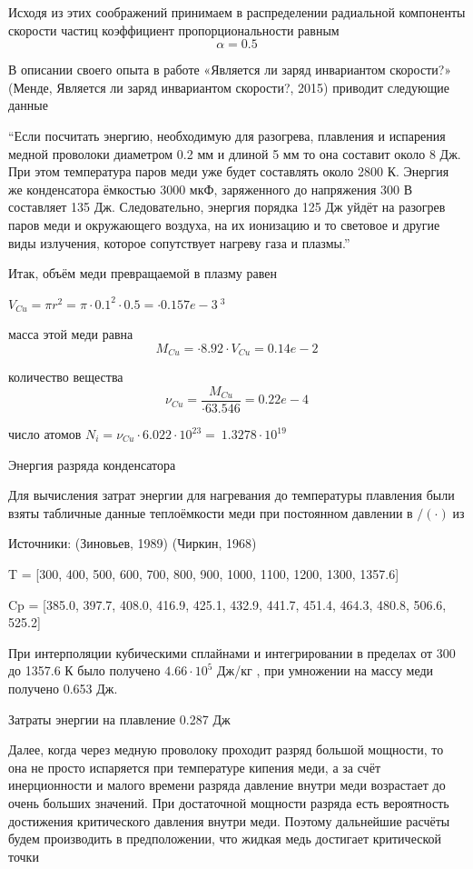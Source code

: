 ﻿\documentclass[12pt, letterpaper]{article}
\begin{document}
Исходя из этих соображений принимаем в распределении радиальной компоненты скорости частиц коэффициент пропорциональности равным $$\alpha = 0.5$$


В описании своего опыта в работе «Является ли заряд инвариантом скорости?» (Менде, Является ли заряд инвариантом скорости?, 2015) приводит следующие данные

“Если посчитать энергию, необходимую для разогрева, плавления и испарения медной проволоки диаметром 0.2 мм и длиной 5 мм то она составит около 8 Дж. При этом температура паров меди уже будет составлять около 2800 К. Энергия же конденсатора ёмкостью 3000 мкФ, заряженного до напряжения 300 В составляет 135 Дж. Следовательно, энергия порядка 125 Дж уйдёт на разогрев паров меди и окружающего воздуха, на их ионизацию и то световое и другие виды излучения, которое сопутствует нагреву газа и плазмы.”

Итак, объём меди превращаемой в плазму равен

${{V}_{Cu}}=\pi {{r}^{2}}=\pi \cdot {{0.1}^{2}}\cdot{ 0.5}=\cdot{0.157e-3}\ {{}^{3}}$

масса этой меди равна \[{{M}_{Cu}}=\cdot{8.92} \cdot {{V}_{Cu}} = {0.14e-2} \]

количество вещества \[{{\nu }_{Cu}}=\frac{{{M}_{Cu}}}{\cdot{63.546}} = {0.22e-4 }\]

число атомов ${{N}_{i}}={{\nu }_{Cu}}\cdot 6.022\cdot {{10}^{23}}=\ 1.3278\cdot {{10}^{19}}$ 

Энергия разряда конденсатора  

Для вычисления затрат энергии для нагревания до температуры плавления были взяты табличные данные теплоёмкости меди при постоянном давлении в ${}/{\left( \cdot  \right)}\;$из  

Источники: (Зиновьев, 1989)  (Чиркин, 1968)

T   = [300,     400,    500,    600,    700,     800,    900,    1000,   1100,  1200,  1300, 1357.6]

Cp = [385.0, 397.7, 408.0, 416.9, 425.1, 432.9, 441.7, 451.4, 464.3, 480.8, 506.6, 525.2] 

При интерполяции кубическими сплайнами и интегрировании в пределах от 300 до 1357.6 К было получено $4.66\cdot {{10}^{5}}$ Дж/кг , при умножении на массу меди получено 0.653 Дж. 

Затраты энергии на плавление 0.287 Дж

Далее, когда через медную проволоку проходит разряд большой мощности, то она не просто испаряется при температуре кипения меди, а за счёт инерционности и малого времени разряда давление внутри меди возрастает до очень больших значений. При достаточной мощности разряда есть вероятность достижения критического давления внутри меди.  Поэтому дальнейшие расчёты будем производить в предположении, что жидкая медь достигает критической точки
\end{document}
